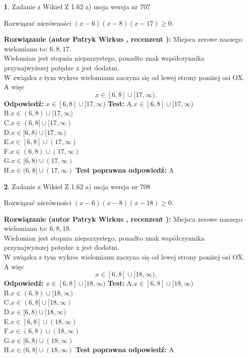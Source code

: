 \documentclass[12pt, a4paper]{article}
\theoremstyle{definition} %
\newtheorem{zad}{}
\newcommand{\zadStart}[1]{\begin{zad}#1\newline}
\newcommand{\zadStop}{\end{zad}}
\newcommand{\rozwStart}[2]{\noindent \textbf{Rozwiązanie (autor #1 , recenzent #2): }\newline}
\newcommand{\rozwStop}{\newline}
\newcommand{\odpStart}{\noindent \textbf{Odpowiedź:}\newline}
\newcommand{\odpStop}{\newline}
\newcommand{\testStart}{\noindent \textbf{Test:}\newline}
\newcommand{\testStop}{\newline}
\newcommand{\kluczStart}{\noindent \textbf{Test poprawna odpowiedź:}\newline}
\newcommand{\kluczStop}{\newline}
\begin{document}
\zadStart{Zadanie z Wikieł Z 1.62 a) moja wersja nr 707}

Rozwiązać nierówności $(x-6)(x-8)(x-17)\ge0$.
\zadStop
\rozwStart{Patryk Wirkus}{}
Miejsca zerowe naszego wielomianu to: $6, 8, 17$.\\
Wielomian jest stopnia nieparzystego, ponadto znak współczynnika przy\linebreak najwyższej potędze x jest dodatni.\\ W związku z tym wykres wielomianu zaczyna się od lewej strony poniżej osi OX. A więc $$x \in [6,8] \cup [17,\infty).$$
\rozwStop
\odpStart
$x \in [6,8] \cup [17,\infty)$
\odpStop
\testStart
A.$x \in [6,8] \cup [17,\infty)$\\
B.$x \in (6,8) \cup [17,\infty)$\\
C.$x \in (6,8] \cup [17,\infty)$\\
D.$x \in [6,8) \cup [17,\infty)$\\
E.$x \in [6,8] \cup (17,\infty)$\\
F.$x \in (6,8) \cup (17,\infty)$\\
G.$x \in [6,8) \cup (17,\infty)$\\
H.$x \in (6,8] \cup (17,\infty)$
\testStop
\kluczStart
A
\kluczStop



\zadStart{Zadanie z Wikieł Z 1.62 a) moja wersja nr 708}

Rozwiązać nierówności $(x-6)(x-8)(x-18)\ge0$.
\zadStop
\rozwStart{Patryk Wirkus}{}
Miejsca zerowe naszego wielomianu to: $6, 8, 18$.\\
Wielomian jest stopnia nieparzystego, ponadto znak współczynnika przy\linebreak najwyższej potędze x jest dodatni.\\ W związku z tym wykres wielomianu zaczyna się od lewej strony poniżej osi OX. A więc $$x \in [6,8] \cup [18,\infty).$$
\rozwStop
\odpStart
$x \in [6,8] \cup [18,\infty)$
\odpStop
\testStart
A.$x \in [6,8] \cup [18,\infty)$\\
B.$x \in (6,8) \cup [18,\infty)$\\
C.$x \in (6,8] \cup [18,\infty)$\\
D.$x \in [6,8) \cup [18,\infty)$\\
E.$x \in [6,8] \cup (18,\infty)$\\
F.$x \in (6,8) \cup (18,\infty)$\\
G.$x \in [6,8) \cup (18,\infty)$\\
H.$x \in (6,8] \cup (18,\infty)$
\testStop
\kluczStart
A
\kluczStop
\end{document}
